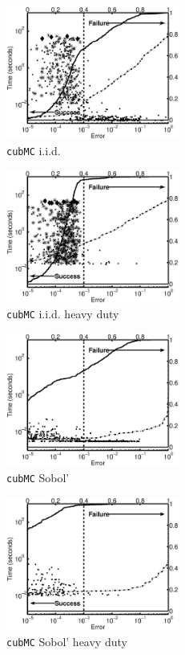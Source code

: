 \documentclass[graybox]{svmult}
\begin{document}
\begin{figure}
\begin{minipage}{5.7cm} \centering \includegraphics[width=5.7cm]{gaussiand=1iidErrTime.eps} \\ {\tt cubMC} i.i.d. \end{minipage}
\begin{minipage}{5.7cm} \centering \includegraphics[width=5.7cm]{gaussiand=1iidheavyErrTime.eps} \\ {\tt cubMC} i.i.d. heavy duty\end{minipage}
\begin{minipage}{5.7cm} \centering \includegraphics[width=5.7cm]{gaussiand=1SobolErrTime.eps} \\ {\tt cubMC}  Sobol'\end{minipage}
\begin{minipage}{5.7cm} \centering \includegraphics[width=5.7cm]{gaussiand=1SobolheavyErrTime.eps} \\ {\tt cubMC} Sobol' heavy duty \end{minipage}


\end{figure}
\end{document}
